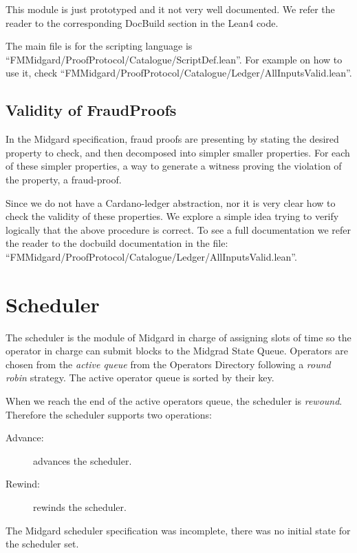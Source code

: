 This module is just prototyped and it not very well documented.
%
We refer the reader to the corresponding DocBuild section in the Lean4 code.

The main file is for the scripting language is
``FMMidgard/ProofProtocol/Catalogue/ScriptDef.lean''.
%
For example on how to use it, check
``FMMidgard/ProofProtocol/Catalogue/Ledger/AllInputsValid.lean''.



\subsection{Validity of FraudProofs}

In the Midgard specification, fraud proofs are presenting by stating the desired
property to check, and then decomposed into simpler smaller properties.
%
For each of these simpler properties, a way to generate a witness proving the
violation of the property, a fraud-proof.

Since we do not have a Cardano-ledger abstraction, nor it is very clear how to
check the validity of these properties.
%
We explore a simple idea trying to verify logically that the above
procedure is correct.
%
To see a full documentation we refer the reader to the docbuild documentation in
the file: ``FMMidgard/ProofProtocol/Catalogue/Ledger/AllInputsValid.lean''.


\section{Scheduler}

The scheduler is the module of Midgard in charge of assigning slots of time so
the operator in charge can submit blocks to the Midgrad State Queue.
%
Operators are chosen from the \emph{active queue} from the Operators Directory
following a \emph{round robin} strategy.
%
The active operator queue is sorted by their key.

When we reach the end of the active operators queue, the scheduler is
\emph{rewound}.
%
Therefore the scheduler supports two operations:
\begin{description}
  \item[Advance:] advances the scheduler.
  \item[Rewind:] rewinds the scheduler.
  \end{description}

The Midgard scheduler specification was incomplete, there was no initial state
for the scheduler set.

